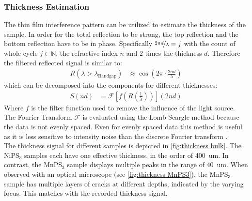 \documentclass[
	twoside,
	parskip=half,
	a4paper,
]{scrbook}
\begin{document}
\subsubsection{Thickness Estimation}
\label{sec:thickness}
The thin film interference pattern can be utilized to estimate the thickness of the sample.
In order for the total reflection to be strong, the top reflection and the bottom reflection have to be in phase.
Specifically $\nicefrac{2nd}{\lambda}=j$ with the count of whole cycle $j\in\mathbb{N}$, the refractive index $n$ and $2$ times the thickness $d$.
Therefore the filtered reflected signal is similar to:
\begin{align}
	R(\lambda > \lambda_\text{Bandgap}) &\approx \cos \left( 2 \pi \cdot \frac{2 n d}{\lambda} \right)
\end{align}
which can be decomposed into the components for different thicknesses:
\begin{align}
	S(nd) &= \mathcal{F}\left[ f\left(R\left(\frac{1}{\lambda}\right)\right)\right]( 2 nd)
\end{align}
Where $f$ is the filter function used to remove the influence of the light source.
The Fourier Transform $\mathcal{F}$ is evaluated using the Lomb-Scargle method \cite{scargle} because the data is not evenly spaced. 
Even for evenly spaced data this method is useful as it is less sensitive to intensity noise than the discrete Fourier transform \cite{scargle}.\\
The thickness signal for different samples is depicted in \autoref{fig:thickness bulk}.
The NiPS$_3$ samples each have one effective thickness, in the order of \SI{400}{um}.
In contrast, the MnPS$_3$ sample displays multiple peaks in the range of \SI{40}{um}.
When observed with an optical microscope (see \autoref{fig:thickness MnPS3}), the MnPS$_3$ sample has multiple layers of cracks at different depths, indicated by the varying focus.
This matches with the recorded thickness signal.
\end{document}
